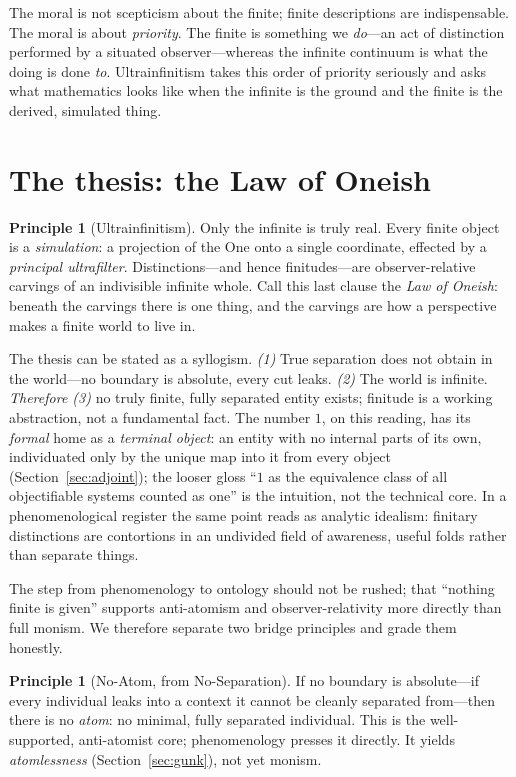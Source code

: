 \documentclass[]{article}
\theoremstyle{definition}
\newtheorem{principle}[theorem]{Principle}
\theoremstyle{remark}
\begin{document}
The moral is not scepticism about the finite; finite descriptions are
indispensable. The moral is about \emph{priority}. The finite is something we
\emph{do}---an act of distinction performed by a situated observer---whereas the
infinite continuum is what the doing is done \emph{to}. Ultrainfinitism takes this
order of priority seriously and asks what mathematics looks like when the infinite
is the ground and the finite is the derived, simulated thing.

\section{The thesis: the Law of Oneish}
\label{sec:thesis}

\begin{principle}[Ultrainfinitism]
\label{prin:ui}
Only the infinite is truly real. Every finite object is a \emph{simulation}: a
projection of the One onto a single coordinate, effected by a \emph{principal
ultrafilter}. Distinctions---and hence finitudes---are observer-relative carvings
of an indivisible infinite whole. Call this last clause the \emph{Law of Oneish}:
beneath the carvings there is one thing, and the carvings are how a perspective
makes a finite world to live in.
\end{principle}

The thesis can be stated as a syllogism. \emph{(1)} True separation does not
obtain in the world---no boundary is absolute, every cut leaks. \emph{(2)} The
world is infinite. \emph{Therefore (3)} no truly finite, fully separated entity
exists; finitude is a working abstraction, not a fundamental fact. The number $1$,
on this reading, has its \emph{formal} home as a \emph{terminal object}: an entity
with no internal parts of its own, individuated only by the unique map into it from
every object (Section~\ref{sec:adjoint}); the looser gloss ``$1$ as the equivalence
class of all objectifiable systems counted as one'' is the intuition, not the
technical core. In a phenomenological register the same point reads as analytic
idealism: finitary distinctions are contortions in an undivided field of awareness,
useful folds rather than separate things.

The step from phenomenology to ontology should not be rushed; that ``nothing finite
is given'' supports anti-atomism and observer-relativity more directly than full
monism. We therefore separate two bridge principles and grade them honestly.

\begin{principle}[No-Atom, from No-Separation]
\label{prin:bridge1}
If no boundary is absolute---if every individual leaks into a context it cannot be
cleanly separated from---then there is no \emph{atom}: no minimal, fully separated
individual. This is the well-supported, anti-atomist core; phenomenology presses it
directly. It yields \emph{atomlessness} (Section~\ref{sec:gunk}), not yet monism.
\end{principle}
\end{document}
